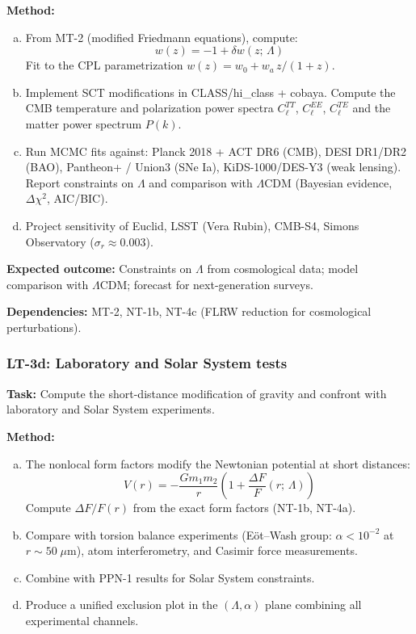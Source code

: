 \documentclass[12pt,a4paper]{article}
\newcommand{\Lam}{\Lambda}
\newcommand{\task}[1]{\noindent\textbf{Task:} #1\par}
\newcommand{\method}[1]{\noindent\textbf{Method:} #1\par}
\newcommand{\outcome}[1]{\noindent\textbf{Expected outcome:} #1\par}
\newcommand{\deps}[1]{\noindent\textbf{Dependencies:} #1\par}
\begin{document}
\method{
\begin{enumerate}[(a)]
  \item From MT-2 (modified Friedmann equations), compute:
    \begin{equation}
      w(z) = -1 + \delta w(z;\, \Lam)
    \end{equation}
    Fit to the CPL parametrization $w(z) = w_0 + w_a\, z/(1+z)$.
  \item Implement SCT modifications in CLASS/hi\_class + cobaya.
    Compute the CMB temperature and polarization power spectra $C_\ell^{TT}$,
    $C_\ell^{EE}$, $C_\ell^{TE}$ and the matter power spectrum $P(k)$.
  \item Run MCMC fits against: Planck 2018 + ACT DR6 (CMB), DESI DR1/DR2 (BAO),
    Pantheon+ / Union3 (SNe Ia), KiDS-1000/DES-Y3 (weak lensing). Report
    constraints on $\Lambda$ and comparison with $\Lambda$CDM (Bayesian evidence,
    $\Delta\chi^2$, AIC/BIC).
  \item Project sensitivity of Euclid, LSST (Vera Rubin), CMB-S4,
    Simons Observatory ($\sigma_r \approx 0.003$).
\end{enumerate}
}

\outcome{Constraints on $\Lambda$ from cosmological data; model comparison
with $\Lambda$CDM; forecast for next-generation surveys.}

\deps{MT-2, NT-1b, NT-4c (FLRW reduction for cosmological perturbations).}

\subsubsection{LT-3d: Laboratory and Solar System tests}
\label{task:LT3d}

\task{Compute the short-distance modification of gravity and confront with
laboratory and Solar System experiments.}

\method{
\begin{enumerate}[(a)]
  \item The nonlocal form factors modify the Newtonian potential at short
    distances:
    \begin{equation}
      V(r) = -\frac{Gm_1 m_2}{r}\left(1 + \frac{\Delta F}{F}(r;\, \Lam)\right)
    \end{equation}
    Compute $\Delta F/F(r)$ from the exact form factors (NT-1b, NT-4a).
  \item Compare with torsion balance experiments (E\"ot--Wash group:
    $\alpha < 10^{-2}$ at $r \sim 50\;\mu$m), atom interferometry,
    and Casimir force measurements.
  \item Combine with PPN-1 results for Solar System constraints.
  \item Produce a unified exclusion plot in the $(\Lambda, \alpha)$ plane
    combining all experimental channels.
\end{enumerate}
}
\end{document}
